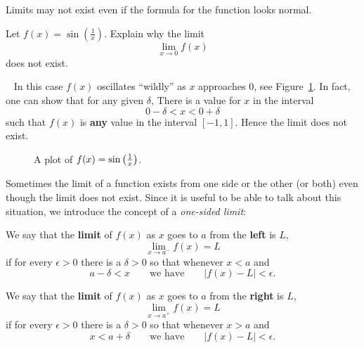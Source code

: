 Limits may not exist even if the formula for the function looks normal.
~\newline
\begin{example}
	Let $f(x) = \sin\left(\frac{1}{x}\right)$. Explain why the limit
	$$\lim_{x\to 0} f(x)$$
	\quad does not exist.
	~\newline
	\begin{solution}~\newline
		In this case $f(x)$ oscillates ``wildly'' as $x$ approaches $0$, see
		Figure~\ref{plot:sin 1/x}. In fact, one can show that for any given
		$\delta$, There is a value for $x$ in the interval
		$$
		0-\delta < x < 0+\delta
		$$
		such that $f(x)$ is \textbf{any} value in the interval $[-1,1]$. Hence
		the limit does not exist.
	\end{solution}
	\begin{figure}[H]
		\centering
		\caption{A plot of $f(x)=\protect\sin\left(\frac{1}{x}\right)$.}
		\label{plot:sin 1/x}
		\end{figure}
\end{example}

Sometimes the limit of a function exists from one side or the other
(or both) even though the limit does not exist. Since it is useful to
be able to talk about this situation, we introduce the concept of a
\textit{one-sided limit}:

\begin{definition}
	We say that the \textbf{limit} of $f(x)$ as $x$ 
	goes to $a$ from the \textbf{left} is $L$,
	$$\lim_{x\to a^-}f(x)=L$$
	if for every $\epsilon>0$ there is a $\delta > 0$ so that 
	whenever $x< a$ and 
	$$a-\delta < x \qquad\text{we have}\qquad |f(x)-L|<\epsilon.$$

	We say that the \textbf{limit} of $f(x)$ as $x$ goes to $a$ 
	from the \textbf{right} is $L$,
	$$\lim_{x\to a^+}f(x)=L$$
	if for every $\epsilon>0$ there is a $\delta > 0$ so that 
	whenever $x > a$ and 
	$$x<a+\delta \qquad\text{we have}\qquad |f(x)-L|<\epsilon.$$
\end{definition}

